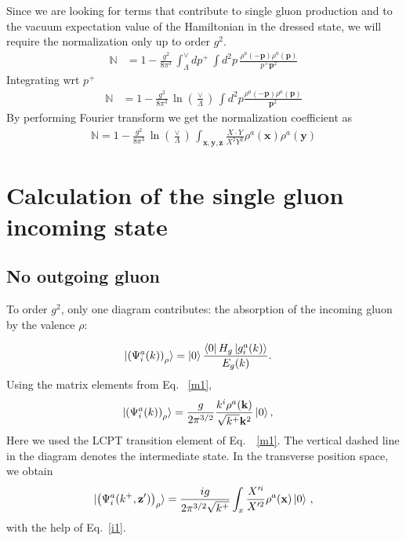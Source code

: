 \documentclass[aps,prd,amsmath,amssymb,nofootinbib]{revtex4-2}
\def\mf#1{\mathbb{#1}}
\def\v#1{\mathbf{#1}}
\numberwithin{equation}{section}
\begin{document}
Since we are looking for terms that contribute to single gluon production and to the vacuum expectation value of the Hamiltonian in the dressed state, we will require the normalization only up to order $g^{2}$.
\begin{align}\label{normmom}
    \mf{N} & = 1- \frac{g^2}{8 \pi^3 }\, \int_{\Lambda}^{\vee} dp^{+}\,
  \int d^2p\, \frac{\rho^a(-\v{p}) \rho^a(\v{p})}{p^{+}\v{p}^2}
\end{align}
Integrating wrt $p^{+}$
\begin{align}
\mf{N} & =  
 1 - \frac{g^2}{8 \pi^3 }\,\ln\left(\frac{\vee}{\Lambda}\right)\,
\int d^2p \frac{\rho^a(-\v{p}) \rho^a(\v{p})}{\v{p}^2}
\end{align}
By performing Fourier transform we get the normalization coefficient as
\begin{align}\label{normpos}
\mf{N} =  
 1 - \frac{g^2}{8 \pi^3 }\,\ln\left(\frac{\vee}{\Lambda}\right)\, 
  \int_{\v{x}, \v{y},\v{z}} \frac{X\cdot Y}{X^2 Y^2}   \rho^a(\v{x}) \rho^a(\v{y})
\end{align}
\section{Calculation of the single gluon incoming state}\label{sec:singleglue}
\subsection{No outgoing gluon}
To order $g^2$, only one diagram contributes: the absorption of the incoming gluon by the valence $\rho$: 
\begin{figure}[h]
\end{figure}
\begin{align}%
\ket{ \left(\Psi^{a}_{i}(k) \right)_{\rho} }   & =
   \ket{0}\frac{\bra{0}H_{g}\ket{g^a_{i}(k)}}{E_{g}(k)}.
\end{align}   
Using the matrix elements from Eq.~ \eqref{m1},
\begin{align}
  \ket{ \left(\Psi^{a}_{i}(k) \right)_{\rho} }   & =     \frac{g}{ 2\pi^{3/2}}\frac{k^i \rho^{a}(\v{k})}{\sqrt{k^+} \v{k}^{2}} \ket{0},
 \end{align}
Here we used the LCPT transition element of Eq.~~\eqref{m1}. The vertical dashed line in the diagram denotes the intermediate state. In the transverse position space, we obtain
\begin{equation}
  \ket{  \left(\Psi^{a}_{i}(k^+, \v{z}') \right)_{\rho} }  = \frac{ig}{2\pi^{3/2}\sqrt{ k^+}}\int_{x}\frac{X^{\prime i}}{X^{\prime 2}} \rho^{a}(\v{x})\ket{0}\,, 
\end{equation}
with the help of Eq.~\eqref{i1}. 
\end{document}
